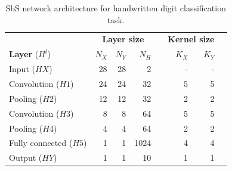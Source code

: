 \begin{table}[!t]\centering
	\caption{SbS network architecture for handwritten digit classification task.}
	\label{tab:sbs_network}
	\scriptsize
	\begin{tabular}{lrrrrrrr}\toprule
		&\multicolumn{3}{c}{\textbf{Layer size}} & &\multicolumn{2}{c}{\textbf{Kernel size}} \\\cmidrule{2-4}\cmidrule{6-7}
		\textbf{Layer} ($H^l$) &$N_X$ &$N_Y$ &$N_H$ & &$K_X$ &$K_Y$ \\\midrule
		Input ($HX$) &28 &28 &2 & &- &- \\
		Convolution ($H1$) &24 &24 &32 & &5 &5 \\
		Pooling ($H2$) &12 &12 &32 & &2 &2 \\
		Convolution ($H3$) &8 &8 &64 & &5 &5 \\
		Pooling ($H4$) &4 &4 &64 & &2 &2 \\
		Fully connected ($H5$) &1 &1 &1024 & &4 &4 \\
		Output ($HY$) &1 &1 &10 & &1 &1 \\
		\bottomrule
	\end{tabular}
\end{table}

